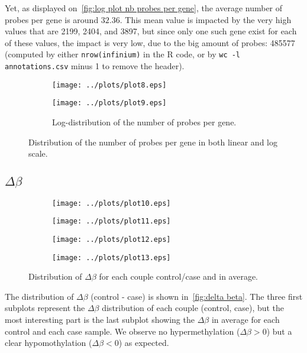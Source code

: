 \documentclass{article}
\begin{document}
Yet, as displayed on~\autoref{fig:log plot nb probes per gene}, the average number of probes per gene is around $32.36$. This mean value is
impacted by the very high values that are 2199, 2404, and 3897, but since only one such gene exist for each of these values, the impact is
very low, due to the big amount of probes: 485577 (computed by either \texttt{nrow(infinium)} in the R code, or by \texttt{wc -l annotations.csv}
minus 1 to remove the header).

\begin{figure}[!b]
	\begin{subfigure}{.5\textwidth}
		\texttt{[image: ../plots/plot8.eps]}
	\end{subfigure}
	\begin{subfigure}{.5\textwidth}
		\texttt{[image: ../plots/plot9.eps]}
		\caption{Log-distribution of the number of probes per gene.\label{fig:log plot nb probes per gene}}
	\end{subfigure}
	\caption{Distribution of the number of probes per gene in both linear and log scale.\label{fig:number of probes per gene}}
\end{figure}

\subsection{$\Delta\beta$}

\begin{figure}[!b]
	\begin{subfigure}{.5\textwidth}
		\texttt{[image: ../plots/plot10.eps]}
	\end{subfigure}
	\begin{subfigure}{.5\textwidth}
		\texttt{[image: ../plots/plot11.eps]}
	\end{subfigure}
	\begin{subfigure}{.5\textwidth}
		\texttt{[image: ../plots/plot12.eps]}
	\end{subfigure}
	\begin{subfigure}{.5\textwidth}
		\texttt{[image: ../plots/plot13.eps]}
	\end{subfigure}
	\caption{Distribution of $\Delta\beta$ for each couple control/case and in average.\label{fig:delta beta}}
\end{figure}

The distribution of $\Delta\beta$ (control - case) is shown in~\autoref{fig:delta beta}. The three first subplots represent the $\Delta\beta$
distribution of each couple (control, case), but the most interesting part is the last subplot showing the $\Delta\beta$ in average for each
control and each case sample. We observe no hypermethylation ($\Delta\beta > 0$) but a clear hypomothylation ($\Delta\beta < 0$) as expected.
\end{document}
